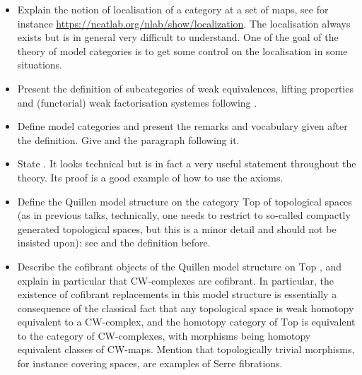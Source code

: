 \documentclass{amsart}
\theoremstyle{definition}
\theoremstyle{remark}
\newcommand{\ra}{\rightarrow}
\newcommand{\Top}{\mathrm{Top}}
\begin{document}
\begin{itemize}
\item Explain the notion of localisation of a category at a set of maps, see for instance \url{https://ncatlab.org/nlab/show/localization}. The localisation always exists but is in general very difficult to understand. One of the goal of the theory of model categories is to get some control on the localisation in some situations.
\item Present the definition of subcategories of weak equivalences, lifting properties and (functorial) weak factorisation systemes following \cite[\S 14.1]{May_Ponto}.
\item Define model categories \cite[Def. 14.2.1]{May_Ponto} and present the remarks and vocabulary given after the definition. Give \cite[Def. 14.2.7]{May_Ponto} and the paragraph following it.
\item State \cite[Lemma 14.2.9]{May_Ponto}. It looks technical but is in fact a very useful statement throughout the theory. Its proof is a good example of how to use the axioms. 
\item Define the Quillen model structure on the category $\mathrm{Top}$ of topological spaces (as in previous talks, technically, one needs to restrict to so-called compactly generated topological spaces, but this is a minor detail and should not be insisted upon): see \cite[Thm. 17.2.2]{May_Ponto} and the definition before. 
\item Describe the cofibrant objects of the Quillen model structure on $\Top$ \cite[Rmk. 17.2.5]{May_Ponto}, and explain in particular that CW-complexes are cofibrant. In particular, the existence of cofibrant replacements in this model structure is essentially a consequence of the classical fact that any topological space is weak homotopy equivalent to a CW-complex, and the homotopy category of $\mathrm{Top}$ is equivalent to the category of CW-complexes, with morphisms being homotopy equivalent classes of CW-maps. Mention that topologically trivial morphisms, for instance covering spaces, are examples of Serre fibrations. 

\end{itemize}
\end{document}
